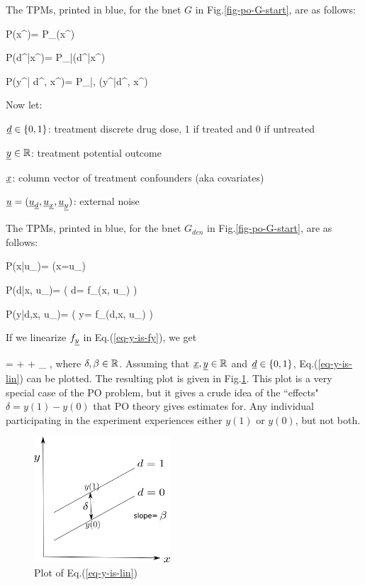 The TPMs, printed in blue,
for the bnet
$G$
in Fig.\ref{fig-po-G-start},
are as follows:


\beq\color{blue}
P(x^\s)=
P_{\rvx}(x^\s)
\eeq

\beq\color{blue}
P(d^\s|x^\s)=
P_{\rvd|\rvx}(d^\s|x^\s)
\eeq


\beq\color{blue}
P(y^\s| d^\s, x^\s)=
P_{\rvy|\rvd, \rvx}(y^\s|d^\s, x^\s)
\eeq




Now let:

${\underline{d}}\in\{0,1\}$: treatment discrete drug dose,  1 if treated and 0 if untreated

${\underline{y}}\in { \mathbb{R}}$:
 treatment potential outcome

${\underline{x}}$: column vector of 
treatment
confounders (aka covariates)


${\underline{u}}=({\underline{u}}_{\underline{d}}, {\underline{u}}_{\underline{x}}, {\underline{u}}_{\underline{y}})$:
external noise

The TPMs, printed in blue,
for the bnet
$G_{den}$
in Fig.\ref{fig-po-G-start},
are as follows:


\beq \color{blue}
P(x|u_\rvx)= \indi(\;\;x=u_\rvx\;\;)
\eeq

\beq\color{blue}
P(d|x, u_\rvd)=
\indi( \;\; d= f_\rvd(x, u_\rvd)
\;\;)
\eeq

\beq\color{blue}
P(y|d,x, u_\rvy)=
\indi( \;\; y= f_\rvy(d,x, u_\rvy)
\;\;)
\label{eq-y-is-fy}
\eeq

If we linearize
 $f_{\underline{y}}$ in Eq.(\ref{eq-y-is-fy}),
we get

\beqa
\rvy =
\delta \rvd + \beta \rvx + \rvu_\rvy
\;,
\label{eq-y-is-lin}
\eeqa
where $\delta, \beta\in { \mathbb{R}}$.
Assuming
that ${\underline{x}}, {\underline{y}}\in { \mathbb{R}}$
and ${\underline{d}}\in \{0,1\}$,
Eq.(\ref{eq-y-is-lin}) can be plotted.
The resulting plot
is given in Fig.\ref{fig-po-two-parallel-lines}.
This plot
is a very special
case of the PO problem,
but it gives a crude idea
of the ``effects" $\delta
= y(1)-y(0)$ that PO theory 
gives estimates for.
Any 
individual participating in the experiment
experiences either $y(1)$
or $y(0)$,
but not both.



\begin{figure}[h!]
\centering
\includegraphics[width=2in]
{pot-out/two-parallel-lines.png}
\caption{Plot  of
Eq.(\ref{eq-y-is-lin})} 
\label{fig-po-two-parallel-lines}
\end{figure}




